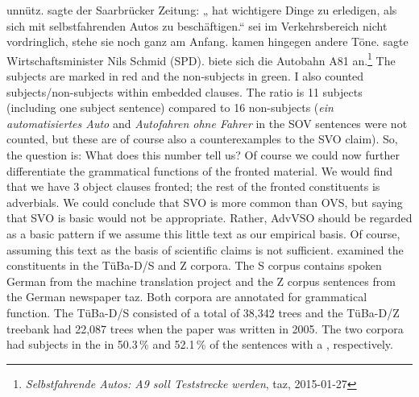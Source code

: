 unnütz.  sagte der Saarbrücker Zeitung: „ hat wichtigere Dinge zu erledigen, als sich mit selbstfahrenden Autos zu beschäftigen.“
 sei im Verkehrsbereich nicht vordringlich,  stehe sie noch ganz am
Anfang.  
kamen hingegen andere Töne.  sagte Wirtschaftsminister Nils Schmid (SPD).  biete sich die Autobahn A81 an.\footnote{\emph{Selbstfahrende Autos: A9 soll Teststrecke werden}, taz, 2015-01-27}
\z
The subjects are marked in red and the non-subjects in green. I also counted subjects/non-subjects
within embedded clauses. The ratio is 11 subjects (including one subject sentence) compared to 16
non-subjects (\emph{ein automatisiertes Auto} and \emph{Autofahren ohne Fahrer} in the SOV sentences were not counted, but these are
of course also a counterexamples to the SVO claim). So, the question is: What does
this number tell us? Of course we could now further differentiate the grammatical functions of the
fronted material. We would find that we have 3 object clauses fronted; the rest of the fronted
constituents is adverbials. We could conclude that SVO is more common than OVS, but saying that SVO
is basic would not be appropriate. Rather, AdvVSO should be regarded as a basic pattern if we
assume this little text as our empirical basis. Of course, assuming this text as the basis of
scientific claims is not sufficient. 
\citet[Section~4]{HK2005a} examined the \vf
constituents in the TüBa-D/S and Z corpora. The S corpus contains spoken German from the machine
translation project \verbmobil and the Z corpus sentences from the German newspaper taz. Both
corpora are annotated for grammatical function. The TüBa-D/S consisted of a total of 38,342 trees
and the TüBa-D/Z treebank had 22,087 trees when the paper was written in 2005. The two corpora had
subjects in the \vf in 50.3\,\% and 52.1\,\% of the sentences with a \vf, respectively. 
